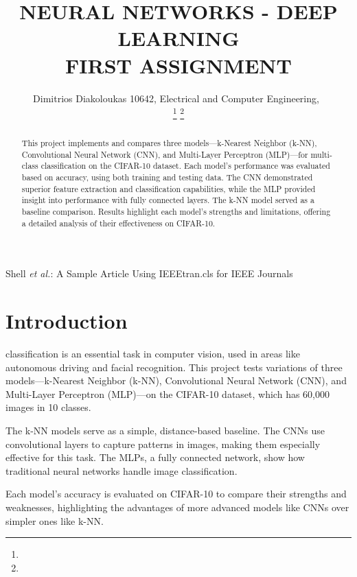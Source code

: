 \documentclass[lettersize,journal]{IEEEtran}
\begin{document}
\title{NEURAL NETWORKS - DEEP LEARNING \\ FIRST ASSIGNMENT}

\author{Dimitrios Diakoloukas 10642, Electrical and Computer Engineering,~

\thanks{}
\thanks{}}

%
{Shell \MakeLowercase{\textit{et al.}}: A Sample Article Using IEEEtran.cls for IEEE Journals}

\maketitle

\begin{abstract}
This project implements and compares three models—k-Nearest Neighbor (k-NN), Convolutional Neural Network (CNN), and Multi-Layer Perceptron (MLP)—for multi-class classification on the CIFAR-10 dataset. Each model’s performance was evaluated based on accuracy, using both training and testing data. The CNN demonstrated superior feature extraction and classification capabilities, while the MLP provided insight into performance with fully connected layers. The k-NN model served as a baseline comparison. Results highlight each model's strengths and limitations, offering a detailed analysis of their effectiveness on CIFAR-10.
\end{abstract}

\section{Introduction}
 classification is an essential task in computer vision, used in areas like autonomous driving and facial recognition. This project tests variations of three models—k-Nearest Neighbor (k-NN), Convolutional Neural Network (CNN), and Multi-Layer Perceptron (MLP)—on the CIFAR-10 dataset, which has 60,000 images in 10 classes.

The k-NN models serve as a simple, distance-based baseline. The CNNs use convolutional layers to capture patterns in images, making them especially effective for this task. The MLPs, a fully connected network, show how traditional neural networks handle image classification.

Each model’s accuracy is evaluated on CIFAR-10 to compare their strengths and weaknesses, highlighting the advantages of more advanced models like CNNs over simpler ones like k-NN.
\end{document}
